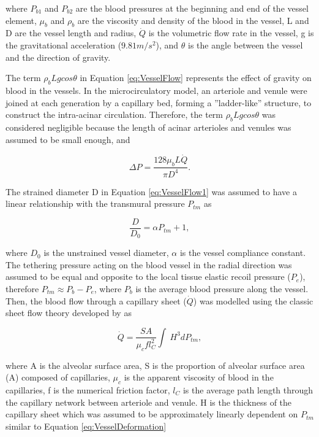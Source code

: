 \noindent where $P_{b1}$ and $P_{b2}$ are the blood pressures at the beginning and end of the vessel element, $\mu_b$ and $\rho_b$ are the viscosity and density of the blood in the vessel, L and D are the vessel length and radius, $\dot{Q}$ is the volumetric flow rate in the vessel, g is the gravitational acceleration ($9.81m/s^2$), and $\theta$ is the angle between the vessel and the direction of gravity. 

The term $\rho_b Lgcos\theta$ in Equation \ref{eq:VesselFlow} represents the effect of gravity on blood in the vessels. In the microcirculatory model, an arteriole and venule were joined at each generation by a capillary bed, forming a ''ladder-like'' structure, to construct the intra-acinar circulation. Therefore, the term $\rho_b Lgcos\theta$ was considered negligible because the length of acinar arterioles and venules was assumed to be small enough, and

\begin{equation}
 \label{eq:VesselFlow1}
 \Delta P = \frac{128 \mu_bL\dot{Q}}{\pi D^{4}}.
\end{equation}

The strained diameter D in Equation \ref{eq:VesselFlow1} was assumed to have a linear relationship with the transmural pressure $P_{tm}$ as

\begin{equation}
 \label{eq:VesselDeformation}
 \frac{D}{D_0} = \alpha P_{tm} + 1,
\end{equation}

\noindent where $D_0$ is the unstrained vessel diameter, $\alpha$ is the vessel compliance constant. The tethering pressure acting on the blood vessel in the radial direction was assumed to be equal and opposite to the local tissue elastic recoil pressure ($P_e$), therefore $P_{tm} \approx P_b - P_e$, where $P_b$ is the average blood pressure along the vessel. Then, the blood flow through a capillary sheet ($\dot{Q}$) was modelled using the classic sheet flow theory developed by \cite{fung1969theory} as

\begin{equation}
 \label{eq:CapillarySheetFlow}
 \dot{Q} = \frac{SA}{\mu_c f l^{2}_{C}} \int\ H^{3}dP_{tm},
\end{equation}

\noindent where A is the alveolar surface area, S is the proportion of alveolar surface area (A) composed of capillaries, $\mu_c$ is the apparent viscosity of blood in the capillaries, f is the numerical friction factor, $l_C$ is the average path length through the capillary network between arteriole and venule. H is the thickness of the capillary sheet which was assumed to be approximately linearly dependent on $P_{tm}$ similar to Equation \ref{eq:VesselDeformation}

